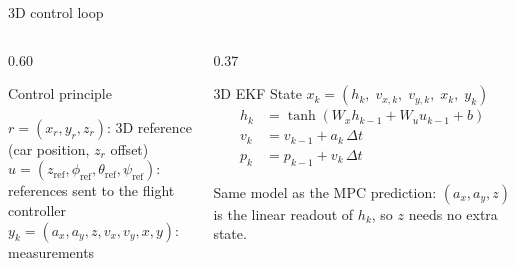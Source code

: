 \begin{frame}{3D control loop}
\begin{columns}[T,onlytextwidth]
\begin{column}{0.60\textwidth}
\begin{block}{Control principle}
{%
                }

                \vspace{2pt}
                {\scriptsize\raggedright
                $r=(x_r, y_r, z_r)$: 3D reference (car position, $z_r$ offset)\\
                $u=(z_{\mathrm{ref}}, \phi_{\mathrm{ref}}, \theta_{\mathrm{ref}},
                \psi_{\mathrm{ref}})$: references sent to the flight controller\\
                $y_k=(a_x, a_y, z, v_x, v_y, x, y)$: measurements\par}
            \end{block}
        \end{column}

        \begin{column}{0.37\textwidth}
            \begin{block}{3D EKF}
                \footnotesize
                State $x_k = (h_k,\; v_{x,k},\; v_{y,k},\; x_k,\; y_k)$
                \setlength{\abovedisplayskip}{2pt}\setlength{\belowdisplayskip}{2pt}
                \begin{align*}
                    h_k &= \tanh(W_x h_{k-1} + W_u u_{k-1} + b)\\
                    v_k &= v_{k-1} + a_k\,\Delta t\\
                    p_k &= p_{k-1} + v_k\,\Delta t
                \end{align*}
                {\scriptsize Same model as the MPC prediction: $(a_x, a_y, z)$
                is the linear readout of $h_k$, so $z$ needs no extra state.\par}
            \end{block}


\end{column}
\end{columns}
\end{frame}
